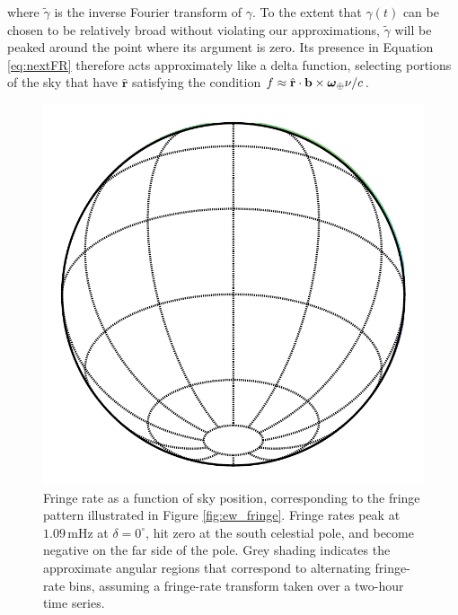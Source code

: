 \documentclass[twocolumn,apj,numberedappendix]{emulateapj}
\newcommand{\rhat}{\hat{\mathbf{r}}}
\begin{document}
where $\tilde{\gamma}$ is the inverse Fourier transform of $\gamma$. To the extent that $\gamma(t)$ can be chosen to be relatively broad without violating our approximations, $\tilde{\gamma}$ will be peaked around the point where its argument is zero. Its presence in Equation \eqref{eq:nextFR} therefore acts approximately like a delta function, selecting portions of the sky that have $\rhat$ satisfying the condition $f \approx \rhat \cdot \mathbf{b} \times \boldsymbol \omega_\Earth \nu / c $.

\begin{figure}\centering
\includegraphics[width=.9\columnwidth]{plots/fringe_contours}
\caption{
Fringe rate as a function of sky position, corresponding to the fringe pattern illustrated in
Figure \ref{fig:ew_fringe}.  Fringe rates peak at $1.09\,\textrm{mHz}$ at $\delta=0^\circ$, hit zero at
the south celestial pole, and become negative on the far side of the pole.  Grey shading indicates
the approximate angular regions that correspond to alternating fringe-rate bins, assuming a
fringe-rate transform taken over a two-hour time series.
}\label{fig:fringe_contours}
\end{figure}
\end{document}
